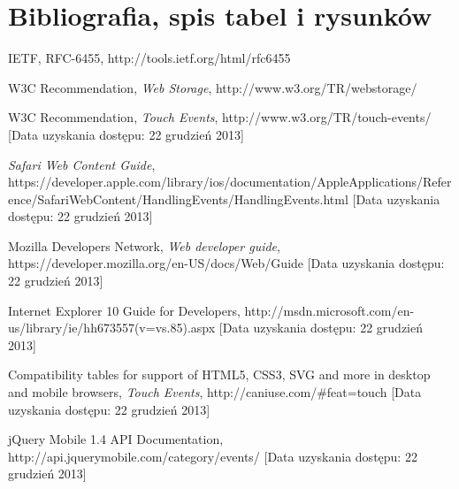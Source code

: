 \section{Bibliografia, spis tabel i rysunków}

\begin{thebibliography}{1}

 IETF, RFC-6455, http://tools.ietf.org/html/rfc6455

 W3C Recommendation, {\em Web Storage}, http://www.w3.org/TR/webstorage/

 W3C Recommendation, {\em Touch Events}, http://www.w3.org/TR/touch-events/ [Data uzyskania dostępu: 22 grudzień 2013]

 {\em Safari Web Content Guide}, https://developer.apple.com/library/ios/documentation/AppleApplications/Reference/SafariWebContent/HandlingEvents/HandlingEvents.html [Data uzyskania dostępu: 22 grudzień 2013]

 Mozilla Developers Network, {\em Web developer guide}, https://developer.mozilla.org/en-US/docs/Web/Guide [Data uzyskania dostępu: 22 grudzień 2013]

 Internet Explorer 10 Guide for Developers, http://msdn.microsoft.com/en-us/library/ie/hh673557(v=vs.85).aspx [Data uzyskania dostępu: 22 grudzień 2013]

 Compatibility tables for support of HTML5, CSS3, SVG and more in desktop and mobile browsers, {\em Touch Events}, http://caniuse.com/#feat=touch [Data uzyskania dostępu: 22 grudzień 2013]

 jQuery Mobile 1.4 API Documentation, http://api.jquerymobile.com/category/events/ [Data uzyskania dostępu: 22 grudzień 2013]

\end{thebibliography}

\listoftables

\listoffigures
